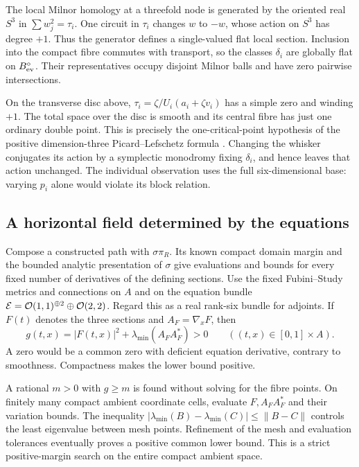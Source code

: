 The local Milnor homology at a threefold node is generated by the
oriented real $S^3$ in $\sum w_j^2=\tau_i$. One circuit in
$\tau_i$ changes $w$ to $-w$, whose action on $S^3$ has degree
$+1$. Thus the generator defines a single-valued flat local
section. Inclusion into the compact fibre commutes with transport,
so the classes $\delta_i$ are globally flat on $B_{\rm ev}^{\circ}$.
Their representatives occupy disjoint Milnor balls and have zero
pairwise intersections.

On the transverse disc above,
$\tau_i=\zeta/U_i(a_i+\zeta v_i)$ has a simple zero and winding
$+1$. The total space over the disc is smooth and its central
fibre has just one ordinary double point. This is precisely the
one-critical-point hypothesis of the positive dimension-three
Picard--Lefschetz formula
\cite[Expos\'e~XIV, \S3.2.3 and Theorem~3.2.11]{Deligne}.
Changing the whisker conjugates its action by a symplectic
monodromy fixing $\delta_i$, and hence leaves that action unchanged.
The individual observation uses the full six-dimensional base:
varying $p_i$ alone would violate its block relation.

\subsection{A horizontal field determined by the equations}

Compose a constructed path with $\sigma\pi_R$. Its known compact
domain margin and the bounded analytic presentation of $\sigma$
give evaluations and bounds for every fixed number of derivatives
of the defining sections. Use the fixed Fubini--Study metrics and
connections on $A$ and on the equation bundle
$\mathcal E=\mathcal O(1,1)^{\oplus2}\oplus\mathcal O(2,2)$.
Regard this as a real rank-six bundle for adjoints. If $F(t)$
denotes the three sections and $A_F=\nabla_xF$, then
\begin{equation}\label{eq:ambient-positivity}
 g(t,x)=|F(t,x)|^2+\lambda_{\min}(A_FA_F^*)>0
                    \qquad ((t,x)\in[0,1]\times A).
\end{equation}
A zero would be a common zero with deficient equation derivative,
contrary to smoothness. Compactness makes the lower bound positive.

A rational $m>0$ with $g\ge m$ is found without solving for the
fibre points. On finitely many compact ambient coordinate cells,
evaluate $F,A_FA_F^*$ and their variation bounds. The inequality
$|\lambda_{\min}(B)-\lambda_{\min}(C)|\le\|B-C\|$ controls
the least eigenvalue between mesh points. Refinement of the mesh
and evaluation tolerances eventually proves a positive common lower
bound. This is a strict positive-margin search on the entire compact
ambient space.

